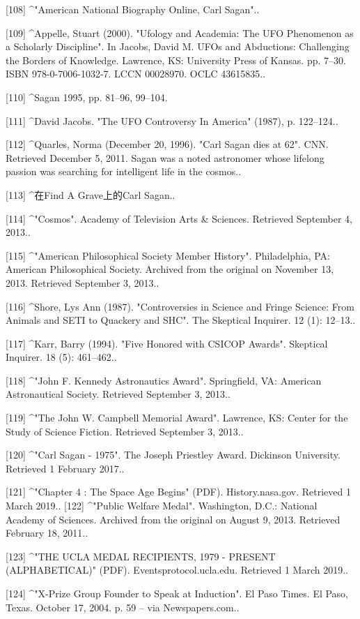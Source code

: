 [108]
^"American National Biography Online, Carl Sagan"..

[109]
^Appelle, Stuart (2000). "Ufology and Academia: The UFO Phenomenon as a Scholarly Discipline". In Jacobs, David M. UFOs and Abductions: Challenging the Borders of Knowledge. Lawrence, KS: University Press of Kansas. pp. 7–30. ISBN 978-0-7006-1032-7. LCCN 00028970. OCLC 43615835..

[110]
^Sagan 1995, pp. 81–96, 99–104.

[111]
^David Jacobs. "The UFO Controversy In America" (1987), p. 122–124..

[112]
^Quarles, Norma (December 20, 1996). "Carl Sagan dies at 62". CNN. Retrieved December 5, 2011. Sagan was a noted astronomer whose lifelong passion was searching for intelligent life in the cosmos..

[113]
^在Find A Grave上的Carl Sagan..

[114]
^"Cosmos". Academy of Television Arts & Sciences. Retrieved September 4, 2013..

[115]
^"American Philosophical Society Member History". Philadelphia, PA: American Philosophical Society. Archived from the original on November 13, 2013. Retrieved September 3, 2013..

[116]
^Shore, Lys Ann (1987). "Controversies in Science and Fringe Science: From Animals and SETI to Quackery and SHC". The Skeptical Inquirer. 12 (1): 12–13..

[117]
^Karr, Barry (1994). "Five Honored with CSICOP Awards". Skeptical Inquirer. 18 (5): 461–462..

[118]
^"John F. Kennedy Astronautics Award". Springfield, VA: American Astronautical Society. Retrieved September 3, 2013..

[119]
^"The John W. Campbell Memorial Award". Lawrence, KS: Center for the Study of Science Fiction. Retrieved September 3, 2013..

[120]
^"Carl Sagan - 1975". The Joseph Priestley Award. Dickinson University. Retrieved 1 February 2017..

[121]
^"Chapter 4 : The Space Age Begins" (PDF). History.nasa.gov. Retrieved 1 March 2019..
[122]
^"Public Welfare Medal". Washington, D.C.: National Academy of Sciences. Archived from the original on August 9, 2013. Retrieved February 18, 2011..

[123]
^"THE UCLA MEDAL RECIPIENTS, 1979 - PRESENT (ALPHABETICAL)" (PDF). Eventsprotocol.ucla.edu. Retrieved 1 March 2019..

[124]
^"X-Prize Group Founder to Speak at Induction". El Paso Times. El Paso, Texas. October 17, 2004. p. 59 – via Newspapers.com..

